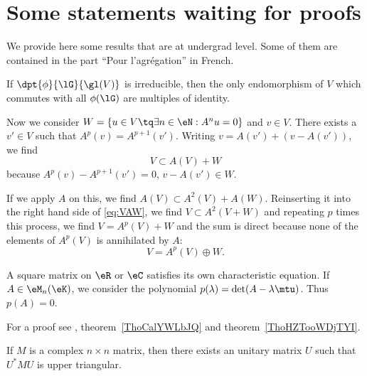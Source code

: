 \section{Some statements waiting for proofs}

We provide here some results that are at undergrad level. Some of them are contained in the part ``Pour l'agrégation'' in French.

\begin{lemma} \label{lem:Schur}
	If $\dpt{\phi}{\lG}{\gl(V)}$ is irreducible, then the only endomorphism of $V$ which commutes with all $\phi(\lG)$ are multiples of identity.
\end{lemma}

Now we consider $W=\{u\in V\tq\exists n\in\eN:A^nu=0\}$ and $v\in V$. There exists a $v'\in V$ such that $A^p(v)=A^{p+1}(v')$. Writing  $v= A(v')+(v-A(v'))$, we find
\begin{equation}\label{eq:VAW}
	V\subset A(V)+W
\end{equation}
because $A^p(v)-A^{p+1}(v')=0$, $v-A(v')\in W$.

If we apply $A$ on this, we find $A(V)\subset A^2(V)+A(W)$. Reinserting it into the right hand side of \eqref{eq:VAW}, we find $V\subset A^2(V+W)$ and repeating $p$ times this process, we find $V=A^p(V)+W$ and the sum is direct because none of the elements of $A^p(V)$ is annihilated by $A$:
\begin{equation}\label{eq:ApoplusW}
	V=A^p(V)\oplus W.
\end{equation}

\begin{theorem} \label{ThoCayleyHamilton}
	A square matrix on \( \eR\) or \( \eC\) satisfies its own characteristic equation. If \( A\in\eM_n(\eK)\), we consider the polynomial \( p(\lambda)=\det(A-\lambda\mtu)\). Thus \( p(A)=0\).
\end{theorem}
For a proof see , theorem~\ref{ThoCalYWLbJQ} and theorem~\ref{ThoHZTooWDjTYI}.

\begin{proposition}     \label{PropMtrDiagablaUnit}
	If \( M\) is a complex \( n\times n\) matrix, then there exists an unitary matrix \( U\) such that \( U^*MU\) is upper triangular.
\end{proposition}

